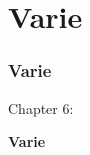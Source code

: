 %

\section{Varie}
\begin{frame}[fragile]
	\frametitle{Varie}

	\begin{center}\huge{Chapter 6:}\end{center}
	\begin{center}\huge{\color{typo3darkgrey}\textbf{Varie}}\end{center}

\end{frame}


